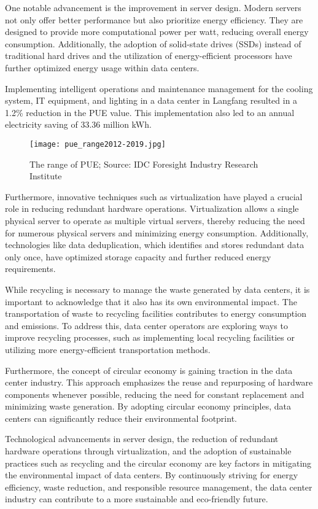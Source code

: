 \documentclass[
  a4paper,  %
  twoside,  %
  bibliography=totoc,
  headsepline,
  cleardoublepage=empty,
  parskip=half,
  draft=false
]{scrbook}
\begin{document}
One notable advancement is the improvement in server design. Modern servers not only offer better performance but also prioritize energy efficiency. They are designed to provide more computational power per watt, reducing overall energy consumption. Additionally, the adoption of solid-state drives (SSDs) instead of traditional hard drives and the utilization of energy-efficient processors have further optimized energy usage within data centers.

Implementing intelligent operations and maintenance management for the cooling system, IT equipment, and lighting in a data center in Langfang resulted in a 1.2\% reduction in the PUE value. This implementation also led to an annual electricity saving of 33.36 million kWh\cite{li2023china}.

\begin{figure}
	\centering
	\texttt{[image: pue\_range2012-2019.jpg]}
	\caption{The range of PUE; Source: IDC Foresight Industry Research Institute}
\end{figure}

Furthermore, innovative techniques such as virtualization have played a crucial role in reducing redundant hardware operations. Virtualization allows a single physical server to operate as multiple virtual servers, thereby reducing the need for numerous physical servers and minimizing energy consumption. Additionally, technologies like data deduplication, which identifies and stores redundant data only once, have optimized storage capacity and further reduced energy requirements.

While recycling is necessary to manage the waste generated by data centers, it is important to acknowledge that it also has its own environmental impact. The transportation of waste to recycling facilities contributes to energy consumption and emissions. To address this, data center operators are exploring ways to improve recycling processes, such as implementing local recycling facilities or utilizing more energy-efficient transportation methods.

Furthermore, the concept of circular economy is gaining traction in the data center industry. This approach emphasizes the reuse and repurposing of hardware components whenever possible, reducing the need for constant replacement and minimizing waste generation. By adopting circular economy principles, data centers can significantly reduce their environmental footprint.

Technological advancements in server design, the reduction of redundant hardware operations through virtualization, and the adoption of sustainable practices such as recycling and the circular economy are key factors in mitigating the environmental impact of data centers. By continuously striving for energy efficiency, waste reduction, and responsible resource management, the data center industry can contribute to a more sustainable and eco-friendly future.
\end{document}
